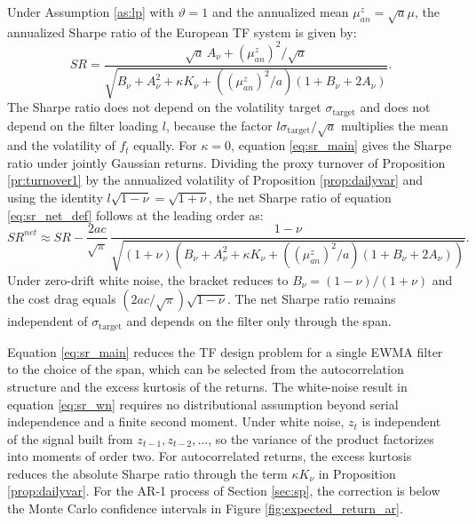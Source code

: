 \documentclass[hidelinks]{siamonline250211}
\begin{document}
\begin{corollary}\label{col:sr}
	Under Assumption \ref{as:lp} with $\vartheta=1$ and the annualized mean $\mu^{z}_{an}=\sqrt{a}\mu$, the annualized Sharpe ratio of the European TF system is given by:
	\begin{equation} \label{eq:sr_main}
		SR = \frac{ \sqrt{a}\, A_{\nu} + \left(\mu^{z}_{an}\right)^{2}/\sqrt{a} }{ \sqrt{ B_{\nu} + A^{2}_{\nu} + \kappa K_{\nu} + \left( \left(\mu^{z}_{an}\right)^{2}/a\right) \left( 1 + B_{\nu} + 2A_{\nu} \right) } }.
	\end{equation}
	The Sharpe ratio does not depend on the volatility target $\sigma_{\mathrm{target}}$ and does not depend on the filter loading $l$, because the factor $l\sigma_{\mathrm{target}}/\sqrt{a}$ multiplies the mean and the volatility of $f_{t}$ equally. For $\kappa=0$, equation \eqref{eq:sr_main} gives the Sharpe ratio under jointly Gaussian returns. Dividing the proxy turnover of Proposition \ref{pr:turnover1} by the annualized volatility of Proposition \ref{prop:dailyvar} and using the identity $l\sqrt{1-\nu}=\sqrt{1+\nu}$, the net Sharpe ratio of equation \eqref{eq:sr_net_def} follows at the leading order as:
	\begin{equation} \label{eq:sr_net}
		SR^{net} \approx SR - \frac{2ac}{\sqrt{\pi}}\, \frac{1-\nu}{\sqrt{ (1+\nu) \left( B_{\nu} + A^{2}_{\nu} + \kappa K_{\nu} + \left( \left(\mu^{z}_{an}\right)^{2}/a\right) \left( 1 + B_{\nu} + 2A_{\nu} \right) \right)} }.
	\end{equation}
	Under zero-drift white noise, the bracket reduces to $B_{\nu}=(1-\nu)/(1+\nu)$ and the cost drag equals $(2ac/\sqrt{\pi})\sqrt{1-\nu}$. The net Sharpe ratio remains independent of $\sigma_{\mathrm{target}}$ and depends on the filter only through the span.
\end{corollary}

Equation \eqref{eq:sr_main} reduces the TF design problem for a single EWMA filter to the choice of the span, which can be selected from the autocorrelation structure and the excess kurtosis of the returns. The white-noise result in equation \eqref{eq:sr_wn} requires no distributional assumption beyond serial independence and a finite second moment. Under white noise, $z_{t}$ is independent of the signal built from $z_{t-1}, z_{t-2}, \ldots$, so the variance of the product factorizes into moments of order two. For autocorrelated returns, the excess kurtosis reduces the absolute Sharpe ratio through the term $\kappa K_{\nu}$ in Proposition \ref{prop:dailyvar}. For the AR-1 process of Section \ref{sec:sp}, the correction is below the Monte Carlo confidence intervals in Figure \ref{fig:expected_return_ar}. 
\end{document}
